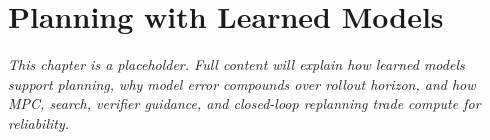 \chapter{Planning with Learned Models}
\label{ch:planning-with-learned-models}


\textit{This chapter is a placeholder. Full content will explain how learned models support planning, why model error compounds over rollout horizon, and how MPC, search, verifier guidance, and closed-loop replanning trade compute for reliability.}
